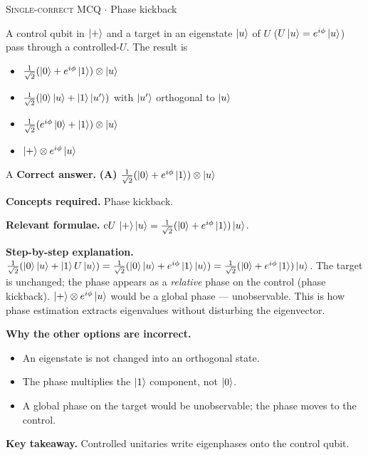 \documentclass[11pt,a4paper]{article}
\newcommand{\optlabel}[1]{\textbf{(#1)}}
\newcommand{\correctlabel}[1]{\textcolor{okgreen}{\textbf{(#1)}\,\ding{51}}}
\newenvironment{qitem}[1]{\begin{list}{}{\setlength{\leftmargin}{3.3em}\setlength{\labelwidth}{3.1em}%
  \setlength{\labelsep}{0.2em}\setlength{\topsep}{3pt}\setlength{\parsep}{3pt}}\item[\textbf{Q.#1}\hfill]}{\end{list}}
\newcommand{\qsep}{\par\vspace{2pt}{\color{black!15}\hrule}\vspace{4pt}}
\newcommand{\qmeta}[2]{{\footnotesize\color{black!60}\textsc{#1} \;$\cdot$\; #2}\par}
\begin{document}
\begin{qitem}{24}
\qmeta{Single-correct MCQ}{Phase kickback}
A control qubit in $\ket+$ and a target in an eigenstate $\ket u$ of $U$ ($U\ket u = e^{i\phi}\ket u$) pass through a controlled-$U$. The result is
\begin{itemize}[leftmargin=2.6em, labelsep=0.4em, itemsep=2pt, topsep=3pt]
\item[\correctlabel{A}] $\tfrac{1}{\sqrt2}(\ket0 + e^{i\phi}\ket1)\otimes\ket u$
\item[\optlabel{B}] $\tfrac{1}{\sqrt2}(\ket0\ket u + \ket1\ket{u'})$ with $\ket{u'}$ orthogonal to $\ket u$
\item[\optlabel{C}] $\tfrac{1}{\sqrt2}(e^{i\phi}\ket0 + \ket1)\otimes\ket u$
\item[\optlabel{D}] $\ket+\otimes e^{i\phi}\ket u$
\end{itemize}
\end{qitem}
\begin{solbox}{A}
\textbf{\color{brand}Correct answer.} \textcolor{okgreen}{\textbf{(A)}} $\tfrac{1}{\sqrt2}(\ket0 + e^{i\phi}\ket1)\otimes\ket u$

\textbf{\color{brand}Concepts required.} Phase kickback.

\textbf{\color{brand}Relevant formulae.} $\mathrm{c}U\,\ket+\ket u = \frac{1}{\sqrt2}(\ket0 + e^{i\phi}\ket1)\ket u$.

\textbf{\color{brand}Step-by-step explanation.} $\tfrac{1}{\sqrt2}(\ket0\ket u + \ket1U\ket u) = \tfrac{1}{\sqrt2}(\ket0\ket u + e^{i\phi}\ket1\ket u) = \tfrac{1}{\sqrt2}(\ket0 + e^{i\phi}\ket1)\ket u$. The target is unchanged; the phase
appears as a \emph{relative} phase on the control (phase kickback). $\ket+\otimes e^{i\phi}\ket u$ would be a global phase --- unobservable. This is how
phase estimation extracts eigenvalues without disturbing the eigenvector.

\textbf{\color{brand}Why the other options are incorrect.}
\begin{itemize}[leftmargin=2.4em, itemsep=1pt, topsep=2pt]
\item[\textbf{(B)}] An eigenstate is not changed into an orthogonal state.
\item[\textbf{(C)}] The phase multiplies the $\ket1$ component, not $\ket0$.
\item[\textbf{(D)}] A global phase on the target would be unobservable; the phase moves to the control.
\end{itemize}
\textbf{\color{brand}Key takeaway.} Controlled unitaries write eigenphases onto the control qubit.
\end{solbox}
\qsep
\end{document}
